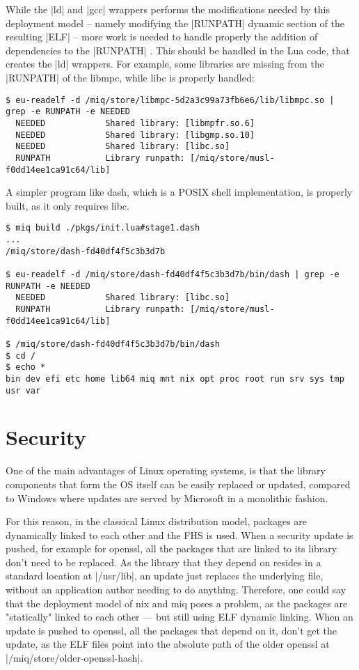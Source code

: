While the |ld| and |gcc| wrappers performs the modifications needed by
this deployment model -- namely modifying the |RUNPATH|
dynamic section of the resulting |ELF| -- more work is
needed to handle properly the addition of dependencies to
the |RUNPATH| . This should be handled in the Lua code, that
creates the |ld| wrappers. For example, some libraries are
missing from the |RUNPATH| of the libmpc, while libc is
properly handled:

\begin{verbatim}
$ eu-readelf -d /miq/store/libmpc-5d2a3c99a73fb6e6/lib/libmpc.so | grep -e RUNPATH -e NEEDED
  NEEDED            Shared library: [libmpfr.so.6]
  NEEDED            Shared library: [libgmp.so.10]
  NEEDED            Shared library: [libc.so]
  RUNPATH           Library runpath: [/miq/store/musl-f0dd14ee1ca91c64/lib]
\end{verbatim}

A simpler program like dash, which is a POSIX shell
implementation, is properly built, as it only requires libc.

\begin{verbatim}
$ miq build ./pkgs/init.lua#stage1.dash
...
/miq/store/dash-fd40df4f5c3b3d7b

$ eu-readelf -d /miq/store/dash-fd40df4f5c3b3d7b/bin/dash | grep -e RUNPATH -e NEEDED
  NEEDED            Shared library: [libc.so]
  RUNPATH           Library runpath: [/miq/store/musl-f0dd14ee1ca91c64/lib]

$ /miq/store/dash-fd40df4f5c3b3d7b/bin/dash
$ cd /
$ echo *
bin dev efi etc home lib64 miq mnt nix opt proc root run srv sys tmp usr var
\end{verbatim}

\section{Security}

One of the main advantages of Linux operating systems, is
that the library components that form the \ac{OS} itself can
be easily replaced or updated, compared to Windows where
updates are served by Microsoft in a monolithic fashion.

For this reason, in the classical Linux distribution model,
packages are dynamically linked to each other and the
\acl{FHS} is used. When a security update is pushed, for
example for openssl, all the packages that are linked to its
library don't need to be replaced. As the library that they
depend on resides in a standard location at |/usr/lib|, an
update just replaces the underlying file, without an
application author needing to do anything. Therefore, one
could say that the deployment model of nix and miq poses a
problem, as the packages are "statically" linked to each
other --- but still using ELF dynamic linking. When an
update is pushed to openssl, all the packages that depend on
it, don't get the update, as the ELF files point into the
absolute path of the older openssl at
|/miq/store/older-openssl-hash|.

